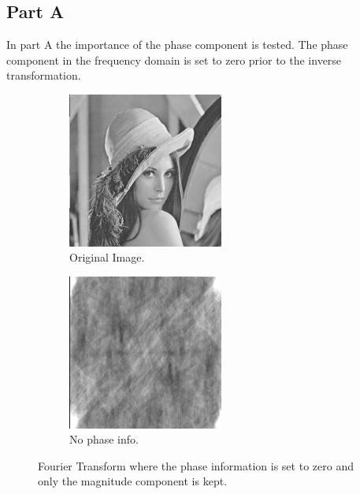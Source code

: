 \documentclass[letter]{article}
\begin{document}
\subsection{Part A}
In part A the importance of the phase component is tested. The phase component in the frequency domain is set to zero prior to the inverse transformation.
\begin{figure}[hbtp]
  \centering
  \begin{subfigure}{5.1cm}
    \includegraphics[width=5.1cm]{images/lenna.png}
    \caption{Original Image.}
  \end{subfigure}
  \begin{subfigure}{5.1cm}
    \includegraphics[width=5.1cm]{images/lenna_mag_only.png}
    \caption{No phase info.}
  \end{subfigure}
  \caption{Fourier Transform where the phase information is set to zero and only the magnitude component is kept.}
  \label{fig:ft_mag}
\end{figure}
\end{document}
